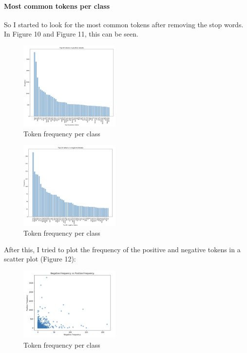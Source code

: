 \documentclass{article}
\begin{document}
	\paragraph{Most common tokens per class}
	
	So I started to look for the most common tokens after removing the stop words. In Figure 10 and Figure 11, this can be seen. 
		
	\begin{figure}[h]
		\label{Figure 10}
		\caption{Token frequency per class}
		\includegraphics[width=50mm]{posfreq.png}
		\centering
	\end{figure}
	
			
	\begin{figure}[h]
		\label{Figure 11}
		\caption{Token frequency per class}
		\includegraphics[width=50mm]{negfreq.png}
		\centering
	\end{figure}
	
	After this, I tried to plot the frequency of the positive and negative tokens in a scatter plot (Figure 12):
	
	\begin{figure}[h]
		\label{Figure 12}
		\caption{Token frequency per class}
		\includegraphics[width=50mm]{neg_post_freq.png}
		\centering
	\end{figure}
\end{document}
